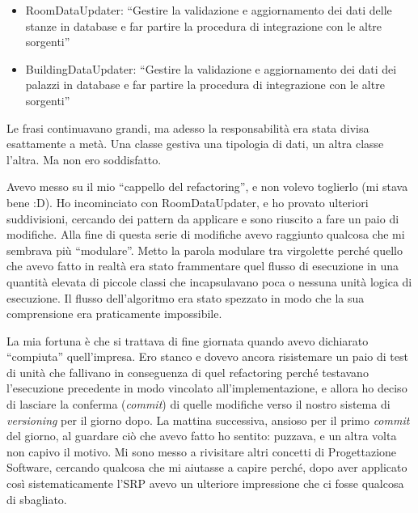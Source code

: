 \documentclass[12pt]{report}
\begin{document}
\begin{itemize}
  \item RoomDataUpdater: ``Gestire la validazione e aggiornamento dei dati delle
  stanze in database e far partire la procedura di integrazione
con le altre sorgenti''
  \item BuildingDataUpdater: ``Gestire la validazione e aggiornamento dei dati 
  dei palazzi in database e far partire la procedura di integrazione
con le altre sorgenti''
\end{itemize}

Le frasi continuavano grandi, ma adesso la responsabilità era stata divisa
esattamente a metà. Una classe gestiva una tipologia di dati, un 
altra classe l'altra. Ma non ero soddisfatto. 

Avevo messo su il mio ``cappello del refactoring'', e non
volevo toglierlo (mi stava bene :D). Ho incominciato con RoomDataUpdater,
e ho provato ulteriori suddivisioni, cercando dei pattern 
da applicare e sono riuscito a fare un paio di modifiche. Alla fine di questa
serie di modifiche avevo raggiunto qualcosa che mi sembrava più ``modulare''.
Metto la parola modulare tra virgolette perché quello che avevo fatto in realtà
era stato frammentare quel flusso di esecuzione in una quantità elevata di
piccole classi che incapsulavano poca o nessuna unità logica di 
esecuzione. Il flusso dell'algoritmo era stato spezzato in modo che la sua
comprensione era praticamente impossibile.

La mia fortuna è che si trattava di fine giornata quando avevo dichiarato 
``compiuta'' quell'impresa. Ero stanco e dovevo ancora risistemare un paio
di test di unità che fallivano in conseguenza di quel refactoring perché
testavano l'esecuzione precedente in modo vincolato all'implementazione, e
allora ho deciso di lasciare la conferma (\textit{commit}) 
di quelle modifiche verso il nostro sistema di \textit{versioning}
per il giorno dopo.
La mattina successiva, ansioso per il primo \textit{commit} del giorno,
al guardare ciò che avevo fatto ho sentito: puzzava, e un altra volta non
capivo il motivo.
Mi sono messo a rivisitare altri concetti di Progettazione 
Software, cercando qualcosa che mi
aiutasse a capire perché, dopo aver applicato così sistematicamente l'SRP
avevo un ulteriore impressione che ci fosse qualcosa di sbagliato.
\end{document}

